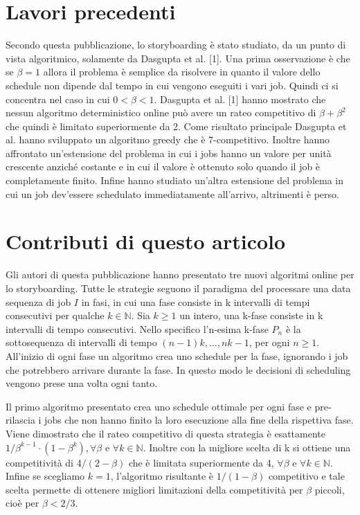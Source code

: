 \documentclass[12pt]{article}
\newcommand*{\N}{\mathbb{N}}
\begin{document}
\section{Lavori precedenti}
Secondo questa pubblicazione, lo storyboarding è stato studiato, da un punto di vista algoritmico, solamente da Dasgupta et al. [1]. Una prima osservazione è che se $\beta  = 1$ allora il problema è semplice da risolvere in quanto il valore dello schedule non dipende dal tempo in cui vengono eseguiti i vari job. Quindi ci si concentra nel caso in cui $0 < \beta < 1$.
Dasgupta et al. [1] hanno mostrato che nessun algoritmo deterministico online può avere un rateo competitivo di $\beta + \beta^{2}$ che quindi è limitato superiormente da 2. Come risultato principale Dasgupta et al. hanno sviluppato un algoritmo greedy che è 7-competitivo. Inoltre hanno affrontato un’estensione del problema in cui i jobs hanno un valore per unità crescente anziché costante e in cui il valore è ottenuto solo quando il job è completamente finito. Infine hanno studiato un’altra estensione del problema in cui un job dev’essere schedulato immediatamente all’arrivo, altrimenti è perso.

\section{Contributi di questo articolo}
Gli autori di questa pubblicazione hanno presentato tre nuovi algoritmi online per lo storyboarding. Tutte le strategie seguono il paradigma del processare una data sequenza di job $I$ in fasi, in cui una fase consiste in k intervalli di tempi consecutivi per qualche $k\in \N$. 
Sia $k \geq 1$ un intero, una k-fase consiste in k intervalli di tempo consecutivi. Nello specifico l’n-esima k-fase $P_{n}$ è la sottosequenza di intervalli di tempo $(n-1)k,…,nk - 1$, per ogni $n \geq 1$. All’inizio di ogni fase un algoritmo crea uno schedule per la fase, ignorando i job che potrebbero arrivare durante la fase. In questo modo le decisioni di scheduling vengono prese una volta ogni tanto.

Il primo algoritmo presentato crea uno schedule ottimale per ogni fase e pre-rilascia i jobs che non hanno finito la loro esecuzione alla fine della rispettiva fase. Viene dimostrato che il rateo competitivo di questa strategia è esattamente $1/\beta^{k-1}\cdot(1-\beta^{k}), \forall \beta$ e $\forall k \in \N$. Inoltre con la migliore scelta di k si ottiene una competitività di $4/(2 - \beta)$ che è limitata superiormente da 4, $\forall \beta$ e $\forall k \in \N$. Infine se scegliamo $k = 1$, l’algoritmo risultante è $1/(1-\beta)$ competitivo e tale scelta permette di ottenere migliori limitazioni della competitività per $\beta$ piccoli, cioè per $\beta < 2/3$.
\end{document}
